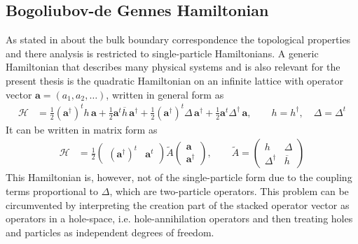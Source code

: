 \subsection{Bogoliubov-de Gennes Hamiltonian}\label{sec:BdG formalism}
As stated in  about the bulk boundary correspondence the topological properties and there analysis is restricted to single-particle Hamiltonians. A generic Hamiltonian that describes many physical systems and is also relevant for the present thesis is the quadratic Hamiltonian on an infinite lattice with operator vector $\mathbf{a}=(a_1,a_2,\dots)$, written in general form as
\begin{align}\label{eq:quadratic Hamiltonian}
\mathcal{H} &= \frac{1}{2}(\mathbf{a}^\dagger)^t h\, \mathbf{a} + \frac{1}{2}\mathbf{a}^t \overline{h}\, \mathbf{a}^\dagger
  + \frac{1}{2}(\mathbf{a}^\dagger)^t \Delta\, \mathbf{a}^\dagger + \frac{1}{2}\mathbf{a}^t \Delta^\dagger\, \mathbf{a},
\qquad h=h^\dagger,\quad \Delta=\Delta^t 
\end{align} 
It can be written in matrix form as
\begin{align*}
    \mathcal{H} &= \frac{1}{2}\begin{pmatrix} (\mathbf{a}^\dagger)^t & \mathbf{a}^t \end{pmatrix} \tilde{A} 
\begin{pmatrix} \mathbf{a} \\ \mathbf{a}^\dagger \end{pmatrix},
\qquad
\tilde{A} = \begin{pmatrix} h & \Delta \\ \Delta^\dagger &  \overline{h} \end{pmatrix} 
\end{align*}
This Hamiltonian is, however, not of the single-particle form due to the coupling terms proportional to $\Delta$, which are two-particle operators. 
This problem can be circumvented by interpreting the creation part of the stacked operator vector as operators in a hole-space, i.e. hole-annihilation operators and then treating holes and particles as independent degrees of freedom. 

